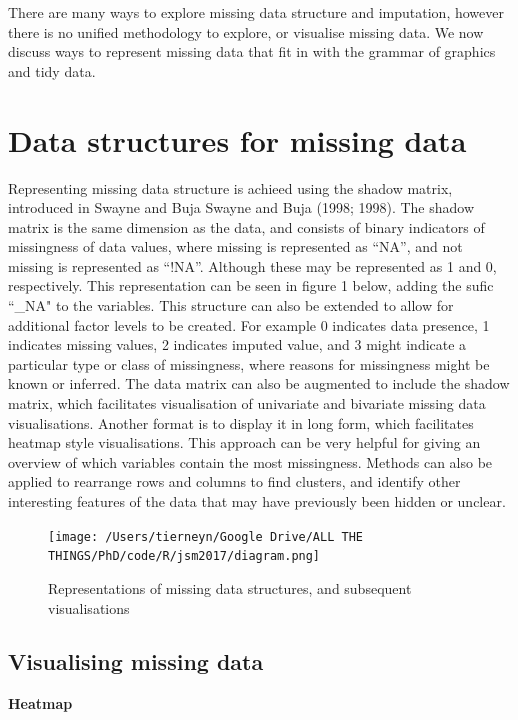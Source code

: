 \documentclass[]{article}
\begin{document}
There are many ways to explore missing data structure and imputation,
however there is no unified methodology to explore, or visualise missing
data. We now discuss ways to represent missing data that fit in with the
grammar of graphics and tidy data.

\section{Data structures for missing
data}\label{data-structures-for-missing-data}

Representing missing data structure is achieed using the shadow matrix,
introduced in Swayne and Buja Swayne and Buja (1998; 1998). The shadow
matrix is the same dimension as the data, and consists of binary
indicators of missingness of data values, where missing is represented
as ``NA'', and not missing is represented as ``!NA''. Although these may
be represented as 1 and 0, respectively. This representation can be seen
in figure 1 below, adding the sufic ``\_NA" to the variables. This
structure can also be extended to allow for additional factor levels to
be created. For example 0 indicates data presence, 1 indicates missing
values, 2 indicates imputed value, and 3 might indicate a particular
type or class of missingness, where reasons for missingness might be
known or inferred. The data matrix can also be augmented to include the
shadow matrix, which facilitates visualisation of univariate and
bivariate missing data visualisations. Another format is to display it
in long form, which facilitates heatmap style visualisations. This
approach can be very helpful for giving an overview of which variables
contain the most missingness. Methods can also be applied to rearrange
rows and columns to find clusters, and identify other interesting
features of the data that may have previously been hidden or unclear.

\begin{figure}[h]
\centering
\texttt{[image: /Users/tierneyn/Google Drive/ALL THE THINGS/PhD/code/R/jsm2017/diagram.png]}
\caption{Representations of missing data structures, and subsequent visualisations}
\end{figure}

\subsection{Visualising missing data}\label{visualising-missing-data}

\textbf{Heatmap}
\end{document}

